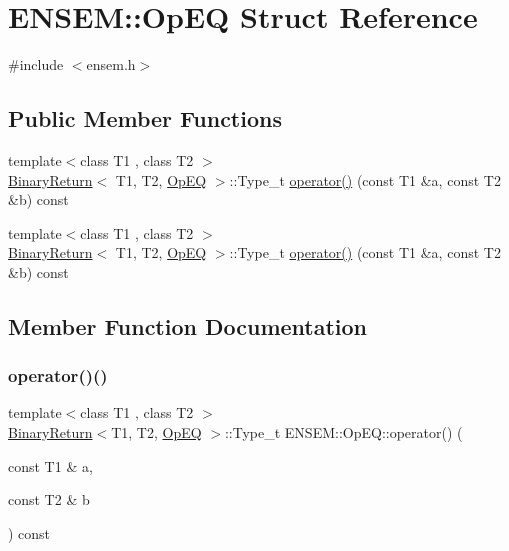 \hypertarget{structENSEM_1_1OpEQ}{}\section{E\+N\+S\+EM\+:\+:Op\+EQ Struct Reference}
\label{structENSEM_1_1OpEQ}


{\ttfamily \#include $<$ensem.\+h$>$}

\subsection*{Public Member Functions}
\begin{DoxyCompactItemize}
\item 
{\footnotesize template$<$class T1 , class T2 $>$ }\\\mbox{\hyperlink{structENSEM_1_1BinaryReturn}{Binary\+Return}}$<$ T1, T2, \mbox{\hyperlink{structENSEM_1_1OpEQ}{Op\+EQ}} $>$\+::Type\+\_\+t \mbox{\hyperlink{structENSEM_1_1OpEQ_a91c7b46e62390256d4a5a7bad129f9b5}{operator()}} (const T1 \&a, const T2 \&b) const
\item 
{\footnotesize template$<$class T1 , class T2 $>$ }\\\mbox{\hyperlink{structENSEM_1_1BinaryReturn}{Binary\+Return}}$<$ T1, T2, \mbox{\hyperlink{structENSEM_1_1OpEQ}{Op\+EQ}} $>$\+::Type\+\_\+t \mbox{\hyperlink{structENSEM_1_1OpEQ_a91c7b46e62390256d4a5a7bad129f9b5}{operator()}} (const T1 \&a, const T2 \&b) const
\end{DoxyCompactItemize}


\subsection{Member Function Documentation}
\mbox{\label{structENSEM_1_1OpEQ_a91c7b46e62390256d4a5a7bad129f9b5}} 
\subsubsection{\texorpdfstring{operator()()}{operator()()}\hspace{0.1cm}{\footnotesize\ttfamily [1/2]}}
{\footnotesize\ttfamily template$<$class T1 , class T2 $>$ \\
\mbox{\hyperlink{structENSEM_1_1BinaryReturn}{Binary\+Return}}$<$T1, T2, \mbox{\hyperlink{structENSEM_1_1OpEQ}{Op\+EQ}} $>$\+::Type\+\_\+t E\+N\+S\+E\+M\+::\+Op\+E\+Q\+::operator() (\begin{DoxyParamCaption}\item[{const T1 \&}]{a,  }\item[{const T2 \&}]{b }\end{DoxyParamCaption}) const\hspace{0.3cm}{\ttfamily [inline]}}

